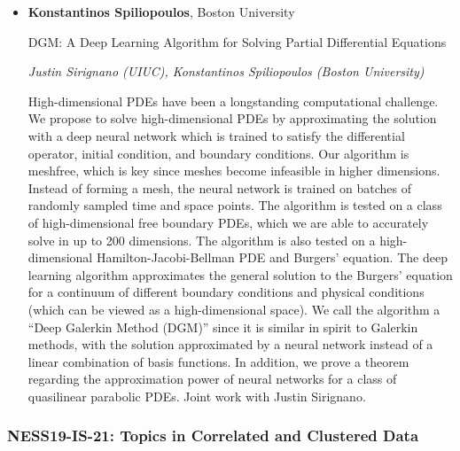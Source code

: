 \begin{itemize}
\item \textbf{Konstantinos Spiliopoulos}, Boston University

DGM: A Deep Learning Algorithm for Solving Partial Differential Equations

\emph{\footnotesize Justin Sirignano (UIUC), Konstantinos Spiliopoulos (Boston University)}

High-dimensional PDEs have been a longstanding computational challenge. We propose to solve high-dimensional PDEs by approximating the solution with a deep neural network which is trained to satisfy the differential operator, initial condition, and boundary conditions. Our algorithm is meshfree, which is key since meshes become infeasible in higher dimensions. Instead of forming a mesh, the neural network is trained on batches of randomly sampled time and space points. The algorithm is tested on a class of high-dimensional free boundary PDEs, which we are able to accurately solve in up to 200 dimensions. The algorithm is also tested on a high-dimensional Hamilton-Jacobi-Bellman PDE and Burgers' equation. The deep learning algorithm approximates the general solution to the Burgers' equation for a continuum of different boundary conditions and physical conditions (which can be viewed as a high-dimensional space). We call the algorithm a ``Deep Galerkin Method (DGM)'' since it is similar in spirit to Galerkin methods, with the solution approximated by a neural network instead of a linear combination of basis functions. In addition, we prove a theorem regarding the approximation power of neural networks for a class of quasilinear parabolic PDEs. Joint work with Justin Sirignano.

\end{itemize}

\subsubsection*{NESS19-IS-21: Topics in Correlated and Clustered Data}

